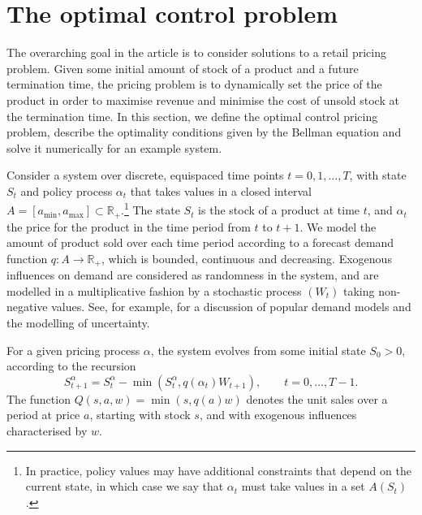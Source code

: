 \documentclass[main.tex]{subfiles}
\begin{document}
\listoftodos

\section{The optimal control problem}\label{sec:bellman_optimal_control}
The overarching goal in the article is to consider solutions to a retail
pricing problem.
Given some initial amount of stock of a product and a future
termination time,
the pricing problem is to
dynamically set the price
of the product in order to maximise revenue and minimise the cost of
unsold stock at the termination time.
In this section, we define the optimal control pricing problem,
describe the optimality conditions given by the Bellman equation and
solve it numerically for an example system.

Consider a system over discrete, equispaced time points
$t=0,1,\dots,T$, with state
$S_t$ and policy process $\alpha_t$ that takes values in a closed
interval $A=[a_{\mathrm{min}},a_{\mathrm{max}}]\subset\mathbb R_+$.\footnote{
  In practice, policy values may have additional constraints that depend
  on the current state,
  in which case we say that $\alpha_t$ must take values
  in a set $A(S_t)$.
}
The state $S_t$ is the stock of a product at time $t$, and
$\alpha_t$ the price for the product in the time period from $t$ to
$t+1$. We model the amount of product sold over each time period according
to a forecast demand
function $q:A\to\mathbb R_+$, which is bounded, continuous and decreasing.
Exogenous influences on demand are considered as randomness in the
system, and are
modelled in a multiplicative fashion by a stochastic process
$(W_t)$ taking non-negative values. See, for example,
\citet[Ch.~7]{talluri2006theory} for a discussion of
popular demand models and the modelling of uncertainty.

For a given pricing process $\alpha$, the
system evolves from some initial state $S_0>0$, according to the
recursion
\begin{equation}\label{eq:stock_dynamics}
  S_{t+1}^\alpha=S_t^\alpha-\min(S_t^\alpha,q(\alpha_t)W_{t+1}),\qquad t=0,\dots,T-1.
\end{equation}
The function $Q(s,a,w)=\min(s,q(a)w)$ denotes the unit sales over a
period at price $a$,
starting with stock $s$, and with exogenous influences
characterised by $w$.
\end{document}
